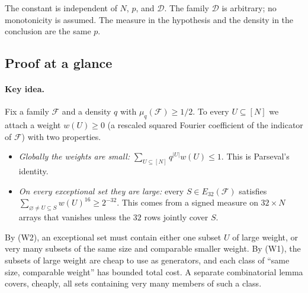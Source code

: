 \documentclass[11pt,letterpaper]{article}
\theoremstyle{definition}
\theoremstyle{remark}
\numberwithin{equation}{section}
\begin{document}
The constant is independent of $N$, $p$, and $\mathcal D$.
The family $\mathcal D$ is arbitrary; no monotonicity is assumed.
The measure in the hypothesis and the density in the conclusion are the
same $p$.

\subsection{Proof at a glance}
\label{sec:glance}

\paragraph{Key idea.}
Fix a family $\mathcal F$ and a density $q$ with $\mu_q(\mathcal F)\ge1/2$.
To every $U\subseteq[N]$ we attach a weight $w(U)\ge0$ (a rescaled squared
Fourier coefficient of the indicator of $\mathcal F$) with two properties.
\begin{itemize}
\item[(W1)] \emph{Globally the weights are small:}
$\sum_{U\subseteq[N]}q^{|U|}w(U)\le1$. This is Parseval's identity.
\item[(W2)] \emph{On every exceptional set they are large:}
every $S\in E_{32}(\mathcal F)$ satisfies
$\sum_{\varnothing\ne U\subseteq S}w(U)^{16}\ge2^{-32}$. This comes from a
signed measure on $32\times N$ arrays that vanishes unless the $32$ rows
jointly cover $S$.
\end{itemize}
By (W2), an exceptional set must contain either one subset $U$ of large
weight, or very many subsets of the same size and comparable smaller
weight. By (W1), the subsets of large weight are cheap to use as
generators, and each class of ``same size, comparable weight'' has bounded
total cost. A separate combinatorial lemma covers, cheaply, all sets
containing very many members of such a class.
\end{document}
